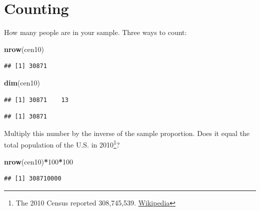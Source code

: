 \documentclass[]{book}
\newenvironment{Shaded}{\begin{snugshade}}{\end{snugshade}}
\newcommand{\KeywordTok}[1]{\textcolor[rgb]{0.13,0.29,0.53}{\textbf{#1}}}
\newcommand{\DecValTok}[1]{\textcolor[rgb]{0.00,0.00,0.81}{#1}}
\newcommand{\OperatorTok}[1]{\textcolor[rgb]{0.81,0.36,0.00}{\textbf{#1}}}
\newcommand{\NormalTok}[1]{#1}
\let\rmarkdownfootnote\footnote%
\def\footnote{\protect\rmarkdownfootnote}
\theoremstyle{definition}
\theoremstyle{definition}
\theoremstyle{definition}
\theoremstyle{remark}
\begin{document}
\section{Counting}\label{counting}

How many people are in your sample. Three ways to count:

\begin{Shaded}
\begin{Highlighting}[]
\KeywordTok{nrow}\NormalTok{(cen10)}
\end{Highlighting}
\end{Shaded}

\begin{verbatim}
## [1] 30871
\end{verbatim}

\begin{Shaded}
\begin{Highlighting}[]
\KeywordTok{dim}\NormalTok{(cen10)}
\end{Highlighting}
\end{Shaded}

\begin{verbatim}
## [1] 30871    13
\end{verbatim}

\begin{Shaded}
\end{Shaded}

\begin{verbatim}
## [1] 30871
\end{verbatim}

Multiply this number by the inverse of the sample proportion. Does it
equal the total population of the U.S. in 2010\footnote{The 2010 Census
  reported 308,745,539.
  \href{https://en.wikipedia.org/wiki/2010_United_States_Census}{Wikipedia}}?

\begin{Shaded}
\begin{Highlighting}[]
\KeywordTok{nrow}\NormalTok{(cen10)}\OperatorTok{*}\DecValTok{100}\OperatorTok{*}\DecValTok{100}
\end{Highlighting}
\end{Shaded}

\begin{verbatim}
## [1] 308710000
\end{verbatim}
\end{document}
